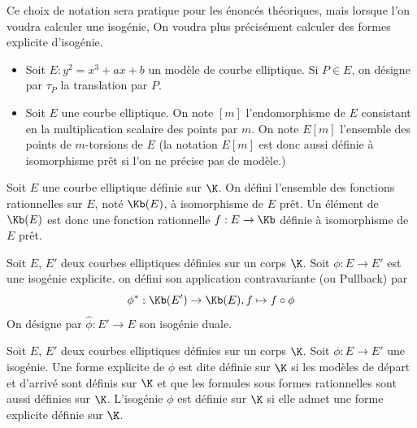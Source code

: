 \begin{Rem}
	Ce choix de notation sera pratique pour les énoncés théoriques, mais lorsque l'on voudra calculer une isogénie, On voudra plus précisément calculer des formes explicite d'isogénie.  
\end{Rem}

\begin{Ex}
	\begin{itemize}
		\item Soit $E : y^2 = x^3 + ax + b$ un modèle de courbe elliptique. Si $P\in E$, on désigne par $\tau_{P}$ la translation par $P$.
		\item Soit $E$ une courbe elliptique. On note $[m]$ l'endomorphisme de $E$ consistant en la multiplication scalaire des points par $m$. On note $E[m]$ l'ensemble des points de $m$-torsions de $E$ (la notation $E[m]$ est donc aussi définie à isomorphisme prêt si l'on ne précise pas de modèle.)
	\end{itemize}
\end{Ex}

\begin{Def} 
	Soit $E$ une courbe elliptique définie sur $\K$. On défini l'ensemble des fonctions rationnelles sur $E$, noté $\Kb(E)$, à isomorphisme de $E$ prêt. Un élément de $\Kb(E)$ est donc une fonction rationnelle $f : E\rightarrow \Kb$ définie à isomorphisme de $E$ prêt.
\end{Def}

\begin{Def}
	Soit $E$, $E'$ deux courbes elliptiques définies sur un corps $\K$. Soit $\phi : E\rightarrow E'$ est une isogénie explicite. on défini son application contravariante (ou Pullback) par
	\begin{equation*}
		\phi^{*} : \Kb(E') \rightarrow \Kb(E), f\mapsto f\circ\phi
	\end{equation*} 
	On désigne par $\hat{\phi} : E'\rightarrow E$ son isogénie duale.
\end{Def}

\begin{Def}
	Soit $E$, $E'$ deux courbes elliptiques définies sur un corps $\K$. Soit $\phi : E\rightarrow E'$ une isogénie. Une forme explicite de $\phi$ est dite définie sur $\K$ si les modèles de départ et d'arrivé sont définis sur $\K$ et que les formules sous formes rationnelles sont aussi définies sur $\K$. L'isogénie $\phi$ est définie sur $\K$ si elle admet une forme explicite définie sur $\K$. 
\end{Def}

